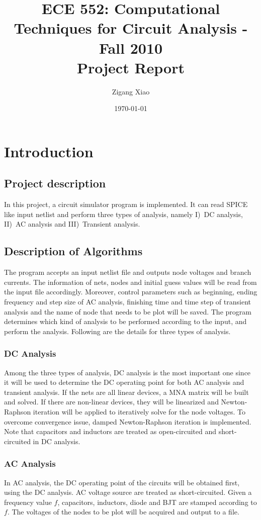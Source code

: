 \documentclass{article}
\title{ECE 552: Computational Techniques for Circuit Analysis - Fall 2010\\
\LARGE Project Report}
\author{Zigang Xiao}
\date{\today}
\begin{document}
\maketitle

\section{Introduction}
\subsection{Project description}
In this project, a circuit simulator program is implemented.
It can read SPICE like input netlist and perform three types of 
analysis, namely I)~DC analysis, II)~AC analysis and III)~Transient analysis.

\subsection{Description of Algorithms}
The program accepts an input netlist file and outputs node voltages and branch
currents.  The information of nets, nodes and initial guess values will be read
from the input file accordingly.  Moreover, control parameters such as
beginning, ending frequency and step size of AC analysis, finishing time and
time step of transient analysis and the name of node that needs to be plot will
be saved. The program determines which kind of analysis to be performed
according to the input, and perform the analysis.  Following are the details
for three types of analysis.

\subsubsection{DC Analysis}
Among the three types of analysis, DC analysis is the most important one since 
it will be used to determine the DC operating point for both AC analysis and
transient analysis.
If the nets are all linear devices, a MNA matrix will be built and solved.  If
there are non-linear devices, they will be linearized and Newton-Raphson
iteration will be applied to iteratively solve for the node voltages. To
overcome convergence issue, damped Newton-Raphson iteration is implemented.
Note that capacitors and inductors are treated as open-circuited and
short-circuited in DC analysis.

\subsubsection{AC Analysis}
In AC analysis, the DC operating point of the circuits will be obtained first, 
using the DC analysis. AC voltage source are treated as short-circuited.
Given a frequency value $f$, capacitors, inductors, diode and BJT are stamped 
according to $f$.
The voltages of the nodes to be plot will be acquired and output to a file.
\end{document}

